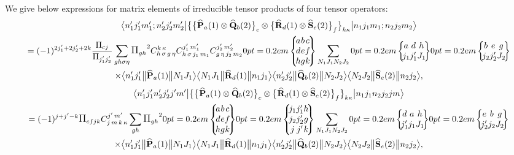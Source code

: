 We give below expressions for matrix elements of irreducible tensor products of four tensor operators:
\begin{multline}
\braOket{ n_{1}^{\prime} j_{1}^{\prime} m_{1}^{\prime} ; n_{2}^{\prime} j_{2}^{\prime} m_{2}^{\prime}}{\bigl\{\bigl\{\widehat{\vect{P}}_{a}(1) \otimes \widehat{\vect{Q}}_{b}(2)\bigr\}_{c} \otimes\bigl\{\widehat{\vect{R}}_{d}(1) \otimes \widehat{\vect{S}}_{e}(2)\bigr\}_{f}\bigr\}_{k \kappa}}{n_{1} j_{1} m_{1} ; n_{2} j_{2} m_{2}}
\\
=(-1)^{2 j_{1}^{\prime}+2 j_{2}^{\prime}+2 k} \frac{\Fact{c j}}{\Fact{j_{1}^{\prime} j_{2}^{\prime}}} \sum_{g h \sigma \eta} \Fact{g h}^{2} 
\clebsch{h}{\sigma}{g}{\eta}{k}{\kappa} 
\clebsch{h}{\sigma}{j_{1}}{m_{1}}{j_{1}^{\prime}}{m_{1}^{\prime}} 
\clebsch{g}{\eta}{j_{2}}{m_{2}}{j_{2}^{\prime}}{m_{2}^{\prime}}
\ninej{a}{b}{c}{d}{e}{f}{h}{g}{k} \sum_{N_{1} J_{1} N_{2} J_{2}}
\sixj{a}{d}{h}{j_{1}}{j_{1}^{\prime}}{J_{1}}
\sixj{b}{e}{g}{j_{2}}{j_{2}^{\prime}}{J_{2}} \\
 \times
\braOketred{ n_{1}^{\prime} j_{1}^{\prime}}{\widehat{\vect{P}}_{a}(1)}{ N_{1} J_{1}}
\braOketred{ N_{1} J_{1}}{\widehat{\vect{R}}_{d}(1)}{ n_{1} j_{1}}
\braOketred{ n_{2}^{\prime} j_{2}^{\prime}}{\widehat{\vect{Q}}_{b}(2)}{ N_{2} J_{2}}
\braOketred{ N_{2} J_{2}}{\widehat{\vect{S}}_{e}(2)}{ n_{2} j_{2}}, \label{eq:13:1:33}
\end{multline}
\begin{multline} 
\braOket{n_{1}^{\prime} j_{1}^{\prime} n_{2}^{\prime} j_{2}^{\prime} j^{\prime} m^{\prime}}{\bigl\{\bigl\{\widehat{\vect{P}}_{a}(1) \otimes \widehat{\vect{Q}}_{b}(2)\bigr\}_{c} \otimes\bigl\{\widehat{\vect{R}}_{d}(1) \otimes \widehat{\vect{S}}_{e}(2)\bigr\}_{f}\bigr\}_{k \kappa}}{n_{1} j_{1} n_{2} j_{2} j m} \\
 =(-1)^{j+j^{\prime}-k} \Fact{c f j k} 
\clebsch{j}{m}{k}{\kappa}{j^{\prime}}{m^{\prime}}
\sum_{g h} \Fact{g h}^{2}
\ninej{a}{b}{c}{d}{e}{f}{h}{g}{k}
\ninej{j_{1}}{j_{1}^{\prime}}{h}{j_{2}}{j_{2}^{\prime}}{g}{j}{j^{\prime}}{k}\sum_{N_{1} J_{1} N_{2} J_{2}}
\sixj{d}{a}{h}{j_{1}^{\prime}}{j_{1}}{J_{1}}
\sixj{e}{b}{g}{j_{2}^{\prime}}{j_{2}}{J_{2}} \\
 \times
\braOketred{ n_{1}^{\prime} j_{1}^{\prime}}{\widehat{\vect{P}}_{a}(1)}{ N_{1} J_{1}}
\braOketred{ N_{1} J_{1}}{\widehat{\vect{R}}_{d}(1)}{ n_{1} j_{1}}
\braOketred{ n_{2}^{\prime} j_{2}^{\prime}}{\widehat{\vect{Q}}_{b}(2)}{ N_{2} J_{2}}
\braOketred{ N_{2} J_{2}}{\widehat{\vect{S}}_{e}(2)}{ n_{2} j_{2}},  \label{eq:13:1:34}
\end{multline}
